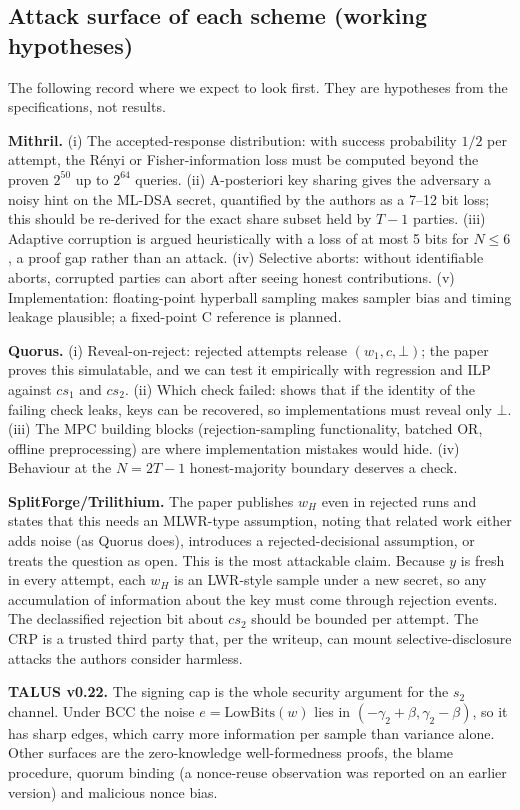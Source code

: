 \documentclass[10pt,conference,a4paper]{IEEEtran}
\newcommand{\LB}{\mathrm{LowBits}}
\begin{document}
\subsection{Attack surface of each scheme (working hypotheses)}
The following record where we expect to look first. They are hypotheses from the specifications, not results.

\textbf{Mithril.} (i) The accepted-response distribution: with success probability $1/2$ per attempt, the R\'enyi or
Fisher-information loss must be computed beyond the proven $2^{50}$ up to $2^{64}$ queries. (ii) A-posteriori key
sharing gives the adversary a noisy hint on the ML-DSA secret, quantified by the authors as a 7--12 bit loss; this should
be re-derived for the exact share subset held by $T-1$ parties. (iii) Adaptive corruption is argued heuristically with a
loss of at most 5 bits for $N\le6$, a proof gap rather than an attack. (iv) Selective aborts: without identifiable aborts,
corrupted parties can abort after seeing honest contributions. (v) Implementation: floating-point hyperball sampling makes
sampler bias and timing leakage plausible; a fixed-point C reference is planned.

\textbf{Quorus.} (i) Reveal-on-reject: rejected attempts release $(w_1,c,\bot)$; the paper proves this simulatable, and
we can test it empirically with regression and ILP against $cs_1$ and $cs_2$. (ii) Which check failed: \cite{rejected}
shows that if the identity of the failing check leaks, keys can be recovered, so implementations must reveal only $\bot$.
(iii) The MPC building blocks (rejection-sampling functionality, batched OR, offline preprocessing) are where
implementation mistakes would hide. (iv) Behaviour at the $N=2T-1$ honest-majority boundary deserves a check.

\textbf{SplitForge/Trilithium.} The paper publishes $w_H$ even in rejected runs and states that this needs an MLWR-type
assumption, noting that related work either adds noise (as Quorus does), introduces a rejected-decisional assumption,
or treats the question as open. This is the most attackable claim. Because $y$ is fresh in every attempt, each $w_H$ is an
LWR-style sample under a new secret, so any accumulation of information about the key must come through rejection
events. The declassified rejection bit about $cs_2$ should be bounded per attempt. The CRP is a trusted third party
that, per the writeup, can mount selective-disclosure attacks the authors consider harmless.

\textbf{TALUS v0.22.} The signing cap is the whole security argument for the $s_2$ channel. Under BCC the noise
$e=\LB(w)$ lies in $(-\gamma_2+\beta,\gamma_2-\beta)$, so it has sharp edges, which carry more information per sample than
variance alone. Other surfaces are the zero-knowledge well-formedness proofs, the blame procedure, quorum binding (a
nonce-reuse observation was reported on an earlier version) and malicious nonce bias.
\end{document}
